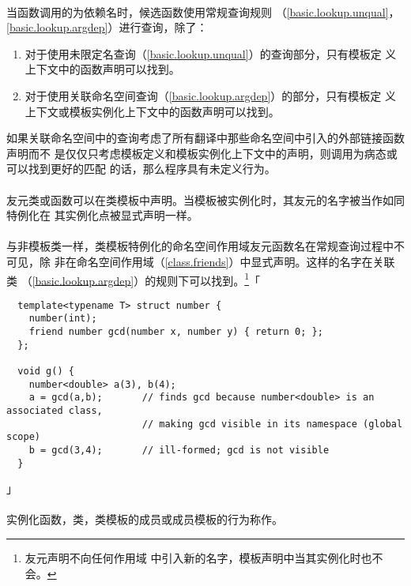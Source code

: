 \paragraph{}
当函数调用的为依赖名时，候选函数使用常规查询规则
（\ref{basic.lookup.unqual}，\ref{basic.lookup.argdep}）进行查询，除了：
\begin{enumerate}
  \item{对于使用未限定名查询（\ref{basic.lookup.unqual}）的查询部分，只有模板定
    义上下文中的函数声明可以找到。}
  \item{对于使用关联命名空间查询（\ref{basic.lookup.argdep}）的部分，只有模板定
    义上下文或模板实例化上下文中的函数声明可以找到。}
\end{enumerate}
如果关联命名空间中的查询考虑了所有翻译中那些命名空间中引入的外部链接函数声明而不
是仅仅只考虑模板定义和模板实例化上下文中的声明，则调用为病态或可以找到更好的匹配
的话，那么程序具有未定义行为。

\paragraph{}
友元类或函数可以在类模板中声明。当模板被实例化时，其友元的名字被当作如同特例化在
其实例化点被显式声明一样。

\paragraph{}
与非模板类一样，类模板特例化的命名空间作用域友元函数名在常规查询过程中不可见，除
非在命名空间作用域（\ref{class.friends}）中显式声明。这样的名字在关联类
（\ref{basic.lookup.argdep}）的规则下可以找到。\footnote{友元声明不向任何作用域
中引入新的名字，模板声明中当其实例化时也不会。}「
\begin{lstlisting}
  template<typename T> struct number {
    number(int);
    friend number gcd(number x, number y) { return 0; };
  };

  void g() {
    number<double> a(3), b(4);
    a = gcd(a,b);       // finds gcd because number<double> is an associated class,
                        // making gcd visible in its namespace (global scope)
    b = gcd(3,4);       // ill-formed; gcd is not visible
  }
\end{lstlisting}」

\paragraph{}
实例化函数，类，类模板的成员或成员模板的行为称作。

